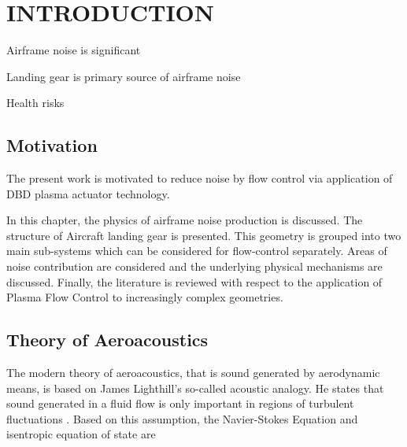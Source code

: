 %
%
%
%
%
%
%
%
%
%


%
%

\chapter{INTRODUCTION}
Airframe noise is significant

Landing gear is primary source of airframe noise

Health risks

\section{Motivation}
The present work is motivated to reduce noise by flow control via application of DBD plasma actuator technology.

In this chapter, the physics of airframe noise production is discussed. The structure of Aircraft landing gear is presented. This geometry is grouped into two main sub-systems which can be considered for flow-control separately. Areas of noise contribution are considered and the underlying physical mechanisms are discussed. Finally, the literature is reviewed with respect to the application of Plasma Flow Control to increasingly complex geometries.

\section{Theory of Aeroacoustics}
The modern theory of aeroacoustics, that is sound generated by aerodynamic means, is based on James Lighthill's so-called acoustic analogy. He states that sound generated in a fluid flow is only important in regions of turbulent fluctuations \cite{howe2003}. Based on this assumption, the Navier-Stokes Equation and isentropic equation of state are


